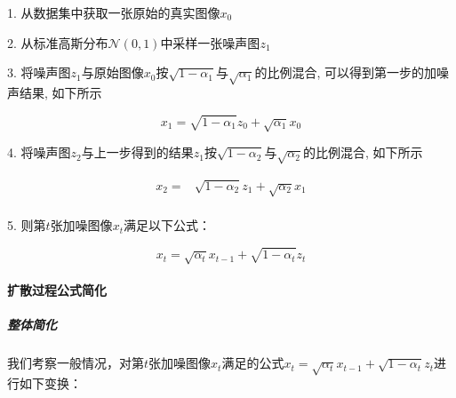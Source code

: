 1. 从数据集中获取一张原始的真实图像$x_0$

2. 从标准高斯分布$\mathcal{N}(0,1)$中采样一张噪声图$z_1$

3. 将噪声图$z_1$与原始图像$x_0$按$\sqrt{1-\alpha_1}$与$\sqrt{\alpha_1}$的比例混合, 可以得到第一步的加噪声结果, 如下所示

\begin{equation}
    x_1 = \sqrt{1-\alpha_1}z_0 + \sqrt{\alpha_1}x_0
\end{equation}

4. 将噪声图$z_2$与上一步得到的结果$z_1$按$\sqrt{1-\alpha_2}$与$\sqrt{\alpha_2}$的比例混合, 如下所示


\begin{equation}
	\begin{aligned}
		x_2 =& \sqrt{1-\alpha_2}z_1 + \sqrt{\alpha_2}x_1\\ 
	\end{aligned}
\end{equation}


5. 则第$t$张加噪图像$x_t$满足以下公式：

\begin{equation}
    x_t = \sqrt{\alpha_t}x_{t-1}+\sqrt{1-\alpha_t}z_t
\end{equation}


\paragraph{扩散过程公式简化}

\subparagraph{整体简化}

我们考察一般情况，对第$t$张加噪图像$x_t$满足的公式$x_t = \sqrt{\alpha_t}x_{t-1}+\sqrt{1-\alpha_t}z_t$进行如下变换：


